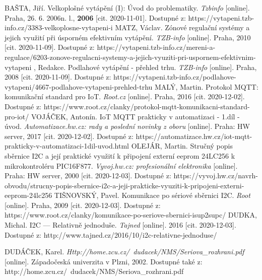 \begin{thebibliography}{3}
BAŠTA, Jiří. Velkoplošné vytápění (I): Úvod do problematiky. \textit{Tzbinfo} [online]. Praha, 26. 6. 2006n. l., \textbf{2006} [cit. 2020-11-01]. Dostupné z: https://vytapeni.tzb-info.cz/3383-velkoplosne-vytapeni-i
MATZ, Václav. Zónové regulační systémy a jejich využití při úsporném efektivním vytápění. \textit{TZB-info} [online]. Praha, 2010 [cit. 2020-11-09]. Dostupné z: https://vytapeni.tzb-info.cz/mereni-a-regulace/6203-zonove-regulacni-systemy-a-jejich-vyuziti-pri-uspornem-efektivnim-vytapeni
, Redakce. Podlahové vytápění - přehled trhu. \textit{TZB-info} [online]. Praha, 2008 [cit. 2020-11-09]. Dostupné z: https://vytapeni.tzb-info.cz/podlahove-vytapeni/4667-podlahove-vytapeni-prehled-trhu
MALÝ, Martin. Protokol MQTT: komunikační standard pro IoT. \textit{Root.cz} [online]. Praha, 2016 [cit. 2020-12-02]. Dostupné z: https://www.root.cz/clanky/protokol-mqtt-komunikacni-standard-pro-iot/
VOJÁČEK, Antonín. IoT MQTT prakticky v automatizaci - 1.díl - úvod. \textit{Automatizace.hw.cz: rady a poslední novinky z oboru} [online]. Praha: HW server, 2017 [cit. 2020-12-02]. Dostupné z: https://automatizace.hw.cz/iot-mqtt-prakticky-v-automatizaci-1dil-uvod.html
OLEJÁR, Martin. Stručný popis sběrnice I2C a její praktické využití k připojení externí eeprom 24LC256 k mikrokontroléru PIC16F877. \textit{Vyvoj.hw.cz: profesionální elektronika} [online]. Praha: HW server, 2000 [cit. 2020-12-03]. Dostupné z: https://vyvoj.hw.cz/navrh-obvodu/strucny-popis-sbernice-i2c-a-jeji-prakticke-vyuziti-k-pripojeni-externi-eeprom-24lc256
TIŠNOVSKÝ, Pavel. Komunikace po sériové sběrnici I2C. \textit{Root} [online]. Praha, 2009 [cit. 2020-12-03]. Dostupné z: https://www.root.cz/clanky/komunikace-po-seriove-sbernici-isup2supc/
DUDKA, Michal. I2C --- Relativně jednoduše. \textit{Tajned} [online]. 2016 [cit. 2020-12-03]. Dostupné z: http://www.tajned.cz/2016/10/i2c-relativne-jednoduse/

DUDÁČEK, Karel. \textit{Http://home.zcu.cz/~dudacek/NMS/Seriova\_rozhrani.pdf} [online]. Západočeská univerzita v Plzni, 2002. Dostupné také z: http://home.zcu.cz/~dudacek/NMS/Seriova\_rozhrani.pdf



\end{thebibliography}
